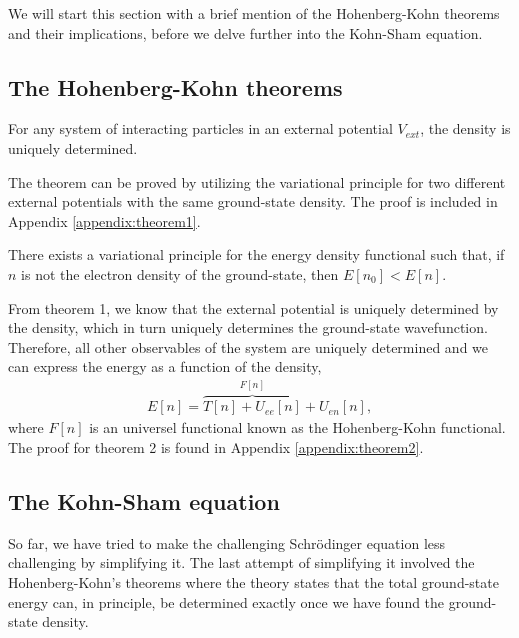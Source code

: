 We will start this section with a brief mention of the Hohenberg-Kohn theorems and their implications, before we delve further into the Kohn-Sham equation.

\subsection{The Hohenberg-Kohn theorems}

\begin{theorem}
  For any system of interacting particles in an external potential $V_{ext}$, the density is uniquely determined.
\end{theorem}

The theorem can be proved by utilizing the variational principle for two different external potentials with the same ground-state density.
The proof is included in Appendix \ref{appendix:theorem1}.

\begin{theorem}
  There exists a variational principle for the energy density functional such that, if $n$ is not the electron density of the ground-state, then $E\left[ n_0 \right] < E\left[ n \right]$.
\end{theorem}

From theorem 1, we know that the external potential is uniquely determined by the density, which in turn uniquely determines the ground-state wavefunction. Therefore, all other observables of the system are uniquely determined and we can express the energy as a function of the density,
\begin{align}
  E[n] = \overbrace{T[n] + U_{ee}[n]}^{F[n]} + U_{en}[n],
  \label{eq:densityfunctional}
\end{align}
where $F[n]$ is an universel functional known as the Hohenberg-Kohn functional. The proof for theorem 2 is found in Appendix \ref{appendix:theorem2}.

\subsection{The Kohn-Sham equation}
So far, we have tried to make the challenging Schrödinger equation less challenging by simplifying it. The last attempt of simplifying it involved the Hohenberg-Kohn's theorems where the theory states that the total ground-state energy can, in principle, be determined exactly once we have found the ground-state density.

